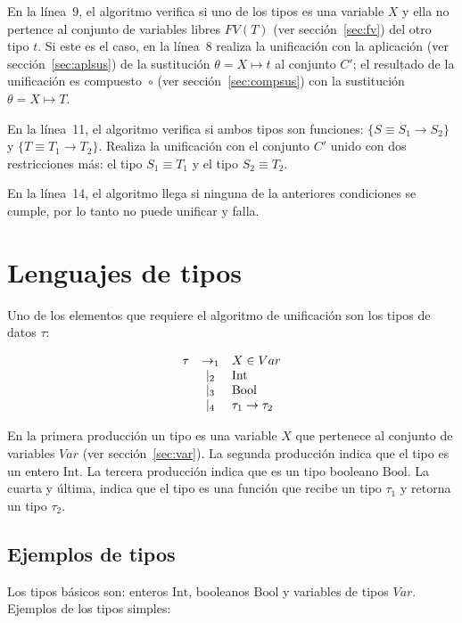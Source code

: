 \documentclass{article}
\theoremstyle{definition}
\begin{document}
En la línea~9, el algoritmo verifica si uno de los tipos es una
variable $X$ y ella no pertence al conjunto de variables libres
$FV(T)$ (ver sección~\ref{sec:fv}) del otro tipo $t$. Si este es el
caso, en la línea~8 realiza la unificación con la aplicación (ver
sección~\ref{sec:aplsus}) de la sustitución $\theta = X \mapsto t$ al
conjunto $C'$; el resultado de la unificación es compuesto~$\circ$
(ver sección~\ref{sec:compsus}) con la sustitución
$\theta = X \mapsto T$.

En la línea~11, el algoritmo verifica si ambos tipos son funciones:
$\{S \equiv S_1 \to S_2\}$ y $\{T \equiv T_1 \to T_2\}$. Realiza la
unificación con el conjunto $C'$ unido con dos restricciones más: el
tipo $S_1 \equiv T_1$ y el tipo $S_2 \equiv T_2$.

En la línea~14, el algoritmo llega si ninguna de la anteriores
condiciones se cumple, por lo tanto no puede unificar y falla.

\section{Lenguajes de tipos}\label{sec:lenguajetipos}

Uno de los elementos que requiere el algoritmo de unificación
son los tipos de datos $\tau$:

\[
  \begin{array}[h]{rcl}
    \tau & \to_1  & X \in Var \\
         & \mid_2 & \text{Int} \\
         & \mid_3 & \text{Bool} \\
         & \mid_4 & \tau_1 \to \tau_2 \\
  \end{array}
\]

En la primera producción un tipo es una variable $X$ que pertenece al
conjunto de variables $Var$ (ver sección~\ref{sec:var}). La segunda
producción indica que el tipo es un entero $\text{Int}$. La tercera
producción indica que es un tipo booleano $\text{Bool}$. La cuarta y
última, indica que el tipo es una función que recibe un tipo $\tau_1$
y retorna un tipo $\tau_2$.

\subsection{Ejemplos de tipos}
\label{sec:ejemtipos}

Los tipos básicos son: enteros $\text{Int}$, booleanos $\text{Bool}$ y
variables de tipos $Var$. Ejemplos de los tipos simples:
\end{document}
